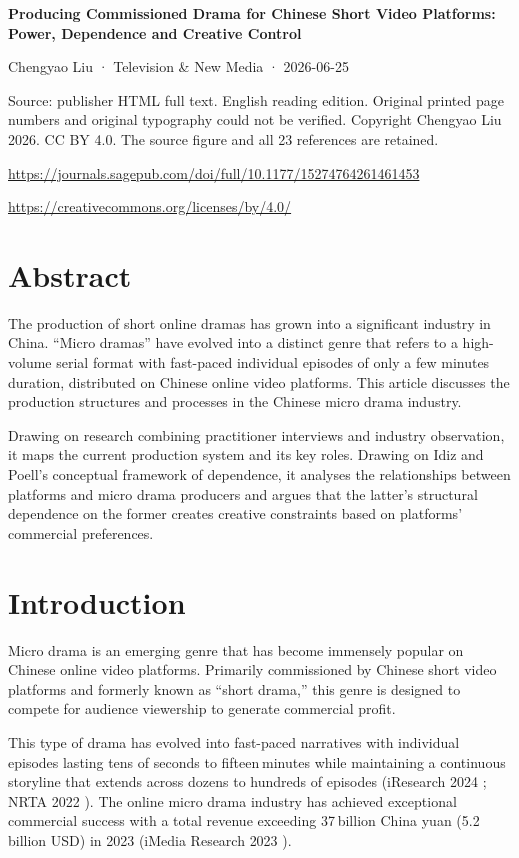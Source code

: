 \documentclass[10pt,a4paper]{article}
\begin{document}
{\Large\bfseries Producing Commissioned Drama for Chinese Short Video Platforms: Power, Dependence and Creative Control\par}\medskip

Chengyao Liu · Television \& New Media · 2026-06-25\par
Source: publisher HTML full text. English reading edition. Original printed page numbers and original typography could not be verified. Copyright Chengyao Liu 2026. CC BY 4.0. The source figure and all 23 references are retained.\par
\url{https://journals.sagepub.com/doi/full/10.1177/15274764261461453}\par
\url{https://creativecommons.org/licenses/by/4.0/}\par\bigskip
\section*{Abstract}
The production of short online dramas has grown into a significant industry in China. “Micro dramas” have evolved into a distinct genre that refers to a high-volume serial format with fast-paced individual episodes of only a few minutes duration, distributed on Chinese online video platforms. This article discusses the production structures and processes in the Chinese micro drama industry.\par
Drawing on research combining practitioner interviews and industry observation, it maps the current production system and its key roles. Drawing on Idiz and Poell’s conceptual framework of dependence, it analyses the relationships between platforms and micro drama producers and argues that the latter’s structural dependence on the former creates creative constraints based on platforms’ commercial preferences.\par
\section*{Introduction}
Micro drama is an emerging genre that has become immensely popular on Chinese online video platforms. Primarily commissioned by Chinese short video platforms and formerly known as “short drama,” this genre is designed to compete for audience viewership to generate commercial profit.\par
This type of drama has evolved into fast-paced narratives with individual episodes lasting tens of seconds to fifteen minutes while maintaining a continuous storyline that extends across dozens to hundreds of episodes (iResearch 2024 ; NRTA 2022 ). The online micro drama industry has achieved exceptional commercial success with a total revenue exceeding 37 billion China yuan (5.2 billion USD) in 2023 (iMedia Research 2023 ).\par
\end{document}
